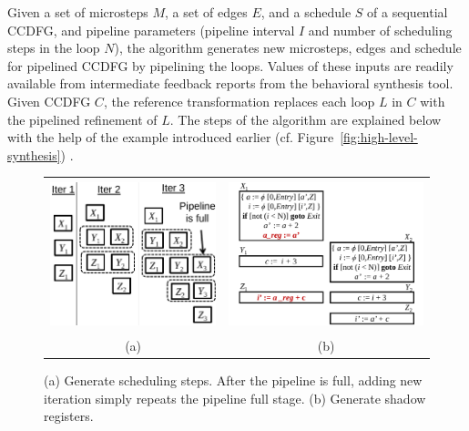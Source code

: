 \medskip
{}
\label{subsec:kecheng's algorithm}

\noindent
Given a set of microsteps $M$, a set of edges $E$, and a schedule $S$ of a
sequential CCDFG, and pipeline parameters (pipeline
interval $I$ and number of scheduling steps in the loop
$N$), the algorithm generates new microsteps, edges and
schedule for pipelined CCDFG by pipelining the
loops. Values of these inputs are readily available from
intermediate feedback reports from the behavioral synthesis
tool. Given CCDFG $C$, the reference transformation replaces
each loop $L$ in $C$ with the pipelined refinement of
$L$. The steps of the algorithm are explained below with the
help of the example introduced earlier
(cf. Figure~\ref{fig:high-level-synthesis}) .


\begin{figure}
\begin{center}
\begin{tabular}{cc}
\includegraphics[height=1.7in]{fig-rpe/generate-scheduling-steps}
& %
\includegraphics[height=1.7in]{fig-rpe/shadow-reg}
\\
(a) & (b)
\end{tabular}
\end{center}
\caption{(a) Generate scheduling steps. After the pipeline is full, adding new iteration simply repeats the pipeline full stage. (b) Generate shadow registers.}
\label{fig:algorithm}
\end{figure}


